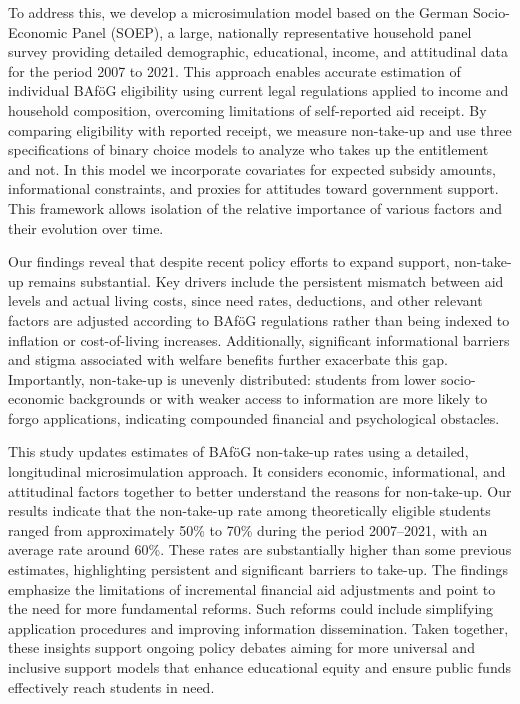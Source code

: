 
To address this, we develop a microsimulation model based on the German Socio-Economic Panel (SOEP), a large, nationally representative household panel survey providing detailed demographic, educational, income, and attitudinal data for the period 2007 to 2021.
This approach enables accurate estimation of individual BAföG eligibility using current legal regulations applied to income and household composition, overcoming limitations of self-reported aid receipt. 
By comparing eligibility with reported receipt, we measure non-take-up and use three specifications of binary choice models to analyze who takes up the entitlement and not. 
In this model we incorporate covariates for expected subsidy amounts, informational constraints, and proxies for attitudes toward government support. 
This framework allows isolation of the relative importance of various factors and their evolution over time.


Our findings reveal that despite recent policy efforts to expand support, non-take-up remains substantial. 
Key drivers include the persistent mismatch between aid levels and actual living costs, since need rates, deductions, and other relevant factors are adjusted according to BAföG regulations rather than being indexed to inflation or cost-of-living increases. 
Additionally, significant informational barriers and stigma associated with welfare benefits further exacerbate this gap.
Importantly, non-take-up is unevenly distributed: students from lower socio-economic backgrounds or with weaker access to information are more likely to forgo applications, indicating compounded financial and psychological obstacles.

This study updates estimates of BAföG non-take-up rates using a detailed, longitudinal microsimulation approach. 
It considers economic, informational, and attitudinal factors together to better understand the reasons for non-take-up.
Our results indicate that the non-take-up rate among theoretically eligible students ranged from approximately 50\% to 70\% during the period 2007--2021, with an average rate around 60\%. 
These rates are substantially higher than some previous estimates, highlighting persistent and significant barriers to take-up. 
The findings emphasize the limitations of incremental financial aid adjustments and point to the need for more fundamental reforms. 
Such reforms could include simplifying application procedures and improving information dissemination.
Taken together, these insights support ongoing policy debates aiming for more universal and inclusive support models that enhance educational equity and ensure public funds effectively reach students in need.



